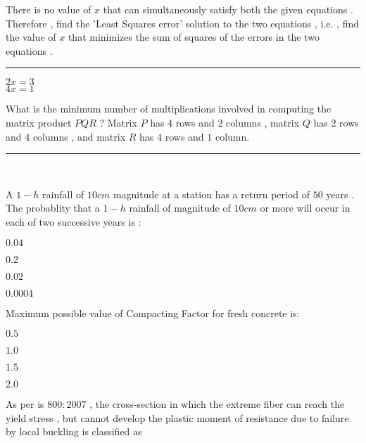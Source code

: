 \iffalse
\title{CE-2013-1-13}
\author{EE24BTECH11036 - Krishna Patil}
\section{ce}
\chapter{2013}
\fi
\item There is no value of $x$ that can simultaneously satisfy both the given equations . Therefore , find the 'Least Squares error' solution to the two equations , i.e. , find the value of $x$ that minimizes the sum of squares of the errors in the two equations . \rule{2cm}{0.4pt}
 \begin{center}
     $2x=3$ \\ $4x=1$ \\
 \end{center}
\item What is the minimum number of multiplications involved in computing the matrix product $PQR$ ? Matrix $P$ has $4$ rows and $2$ columns ,  matrix $Q$ has $2$ rows and $4$ columns , and matrix $R$ has $4$ rows and $1$ column. \rule{2cm}{0.4pt} \\
\item A $1-h$ rainfall of $10cm$ magnitude at a station has a return period of $50$ years . The probablity that a $1-h$ rainfall of magnitude of $10cm$  or more will occur in each of two successive years is :  
\begin{enumerate}
\begin{multicols}{2}
\item $ 0.04 $
\item $ 0.2 $ 
\item $ 0.02 $
\item $ 0.0004 $
\end{multicols}
\end{enumerate}
\item Maximum possible value of Compacting Factor for fresh  concrete is:
\begin{enumerate}
\begin{multicols}{2}
\item $0.5$
\item $1.0$
\item $1.5$
\item $2.0$
\end{multicols}
\end{enumerate}
\item As per is $800:2007$ , the cross-section in which the extreme fiber can reach the yield stress , but cannot develop the plastic moment of resistance due to failure by local buckling is classified as
